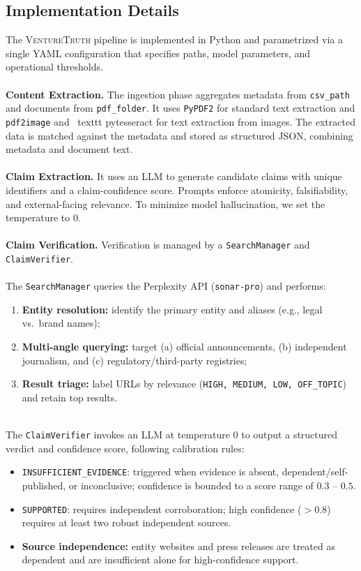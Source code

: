 \subsection{Implementation Details}
The \textsc{VentureTruth} pipeline is implemented in Python and parametrized via a single YAML configuration that specifies paths, model parameters, and operational thresholds.
\\
\\
\textbf{Content Extraction.} The ingestion phase aggregates metadata from \texttt{csv\_path} and documents from \texttt{pdf\_folder}. It uses \texttt{PyPDF2} for standard text extraction and \texttt{pdf2image} and \ texttt {pytesseract} for text extraction from images. The extracted data is matched against the metadata and stored as structured JSON, combining metadata and document text.
\\
\\
\textbf{Claim Extraction.} It uses an LLM to generate candidate claims with unique identifiers and a claim-confidence score. Prompts enforce atomicity, falsifiability, and external-facing relevance. To minimize model hallucination, we set the temperature to 0.
\\
\\
\textbf{Claim Verification.} Verification is managed by a \texttt{SearchManager} and \texttt{ClaimVerifier}.
\\
\\
The \texttt{SearchManager} queries the Perplexity API (\texttt{sonar-pro}) and performs:
\begin{enumerate}
    \item \textbf{Entity resolution:} identify the primary entity and aliases (e.g., legal vs.\ brand names);
    \item \textbf{Multi-angle querying:} target (a) official announcements, (b) independent journalism, and (c) regulatory/third-party registries;
    \item \textbf{Result triage:} label URLs by relevance (\texttt{HIGH, MEDIUM, LOW, OFF\_TOPIC}) and retain top results.
\end{enumerate}
~\\
The \texttt{ClaimVerifier} invokes an LLM at temperature 0 to output a structured verdict and confidence score, following calibration rules:
\begin{itemize}
    \item \texttt{INSUFFICIENT\_EVIDENCE}: triggered when evidence is absent, dependent/self-published, or inconclusive; confidence is bounded to a score range of $0.3$ -- $0.5$.
    \item \texttt{SUPPORTED}: requires independent corroboration; high confidence ($>0.8$) requires at least two robust independent sources.
    \item \textbf{Source independence:} entity websites and press releases are treated as dependent and are insufficient alone for high-confidence support.
\end{itemize}
